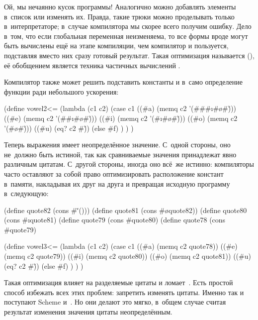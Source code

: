 Ой, мы нечаянно кусок программы! Аналогично можно добавлять элементы в~список
 или изменять их. Правда, такие трюки можно проделывать только
в~интерпретаторе; в~случае компилятора мы скорее всего получим ошибку. Дело
в~том, что если глобальная переменная  неизменяема, то все формы
вроде  могут быть вычислены ещё на
этапе компиляции, чем компилятор и пользуется, подставляя вместо них сразу
готовый результат. Такая оптимизация называется 
(), её обобщением является техника частичных
вычислений \cite{jgs93}.

Компилятор также может решить подставить константы и в~само определение функции
 ради небольшого ускорения:

\begin{code:lisp}
(define vowel2<=
  (lambda (c1 c2)
    (case c1
      ((\#a) (memq c2 '(#\a #\e #\i #\o #\u)))
      ((\#e) (memq c2 '(#\e #\i #\o #\u)))
      ((\#i) (memq c2 '(#\i #\o #\u)))
      ((\#o) (memq c2 '(#\o #\u)))
      ((\#u) (eq? c2 #\u))
      (else  #f) ) ) )
\end{code:lisp}

Теперь выражения  имеет неопределённое значение. С~одной стороны,
оно не~должно быть истиной, так как сравниваемые значения принадлежат явно
различным цитатам. С~другой стороны, иногда оно всё~же истинно: компиляторы
часто оставляют за собой право оптимизировать расположение констант в~памяти,
накладывая их друг на друга и превращая исходную программу в~следующую:

\begin{code:lisp}
(define quote82 (cons #\u '()))
(define quote81 (cons #\o quote82))
(define quote80 (cons #\i quote81)
(define quote79 (cons #\e quote80)
(define quote78 (cons #\a quote79)

(define vowel3<=
  (lambda (c1 c2)
    (case c1
      ((\#a) (memq c2 quote78))
      ((\#e) (memq c2 quote79))
      ((\#i) (memq c2 quote80))
      ((\#o) (memq c2 quote81))
      ((\#u) (eq? c2 #\u))
      (else  #f) ) ) )
\end{code:lisp}

Такая оптимизация влияет на разделяемые цитаты и ломает~. Есть простой
способ избежать всех этих проблем: запретить изменять цитаты. Именно так и
поступают Scheme и~{\CommonLisp}. Но они делают это мягко, в~общем случае считая
результат изменения значения цитаты неопределённым.

